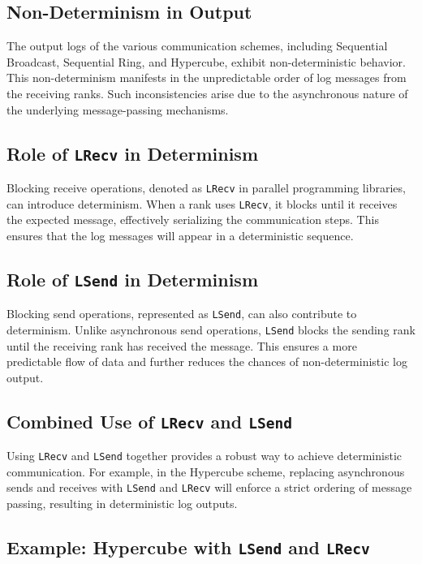 \documentclass[11pt]{article}
\begin{document}
\subsection{Non-Determinism in Output}

The output logs of the various communication schemes, including Sequential Broadcast, Sequential Ring, and Hypercube, exhibit non-deterministic behavior. This non-determinism manifests in the unpredictable order of log messages from the receiving ranks. Such inconsistencies arise due to the asynchronous nature of the underlying message-passing mechanisms.

\subsection{Role of \texttt{LRecv} in Determinism}

Blocking receive operations, denoted as \texttt{LRecv} in parallel programming libraries, can introduce determinism. When a rank uses \texttt{LRecv}, it blocks until it receives the expected message, effectively serializing the communication steps. This ensures that the log messages will appear in a deterministic sequence.

\subsection{Role of \texttt{LSend} in Determinism}

Blocking send operations, represented as \texttt{LSend}, can also contribute to determinism. Unlike asynchronous send operations, \texttt{LSend} blocks the sending rank until the receiving rank has received the message. This ensures a more predictable flow of data and further reduces the chances of non-deterministic log output.

\subsection{Combined Use of \texttt{LRecv} and \texttt{LSend}}

Using \texttt{LRecv} and \texttt{LSend} together provides a robust way to achieve deterministic communication. For example, in the Hypercube scheme, replacing asynchronous sends and receives with \texttt{LSend} and \texttt{LRecv} will enforce a strict ordering of message passing, resulting in deterministic log outputs.

\subsection{Example: Hypercube with \texttt{LSend} and \texttt{LRecv}}
\end{document}

